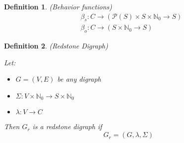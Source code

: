 \documentclass{article}
\newtheorem{defn}{Definition}[section]
\begin{document}
\medskip

\begin{defn} (Behavior functions)
\begin{align}
	& \beta_{s} : C \to (\mathcal{P}(S) \times S \times \mathbb{N}_{0} \to S) \\
	& \beta_{o} : C \to (S \times \mathbb{N}_{0} \to S)
\end{align}

\end{defn}

\medskip

\begin{defn} (Redstone Digraph)
	
	Let:
	
	\begin{itemize}
		\item \(G = (V, E)\) be any digraph
		\item \(\Sigma : V \times \mathbb{N}_{0} \to S \times \mathbb{N}_{0}\)
		\item \(\lambda : V \to C\)
	\end{itemize}

	Then \(G_{r}\) is a redstone digraph if 
	\begin{equation}
	G_{r} = (G, \lambda, \Sigma)
	\end{equation}
	
\end{defn}
	
\end{document}
